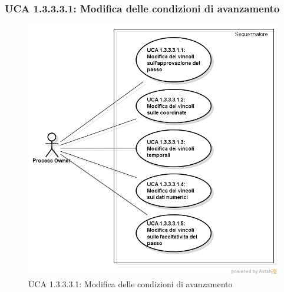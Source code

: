 \subsubsection{UCA 1.3.3.3.1: Modifica delle condizioni di avanzamento}
\begin{figure}[H]
\centering
\includegraphics[trim=0cm 0.8cm 0cm 0cm,clip=true,width=%
\textwidth]
{./grafici/A13331}
\caption{UCA 1.3.3.3.1: Modifica delle condizioni di avanzamento}
\end{figure}
